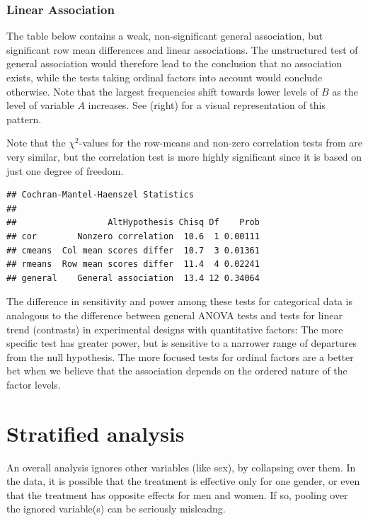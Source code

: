 \documentclass[11pt]{book}
\renewenvironment{knitrout}{\small\renewcommand{\baselinestretch}{.85}}{} %
\begin{document}
\subsubsection{Linear Association}

The table below contains a weak,
non-significant general association, but significant row mean
differences and linear associations.
The unstructured test of general association would therefore
lead to the conclusion that no association exists, while the
tests taking ordinal factors into account would conclude otherwise.
Note that the largest frequencies
shift towards lower levels of $B$ as the level of variable $A$ increases.
See (right) for a visual representation of this pattern.



Note that the \(\chi^2\)-values for the row-means and non-zero
correlation tests from 
are very similar, but the correlation test is more
highly significant since it is based on just one degree of
freedom.
\begin{knitrout}
\color{fgcolor}\begin{kframe}
\begin{alltt}
\end{alltt}
\begin{verbatim}
## Cochran-Mantel-Haenszel Statistics 
## 
##                  AltHypothesis Chisq Df    Prob
## cor        Nonzero correlation  10.6  1 0.00111
## cmeans  Col mean scores differ  10.7  3 0.01361
## rmeans  Row mean scores differ  11.4  4 0.02241
## general    General association  13.4 12 0.34064
\end{verbatim}
\end{kframe}
\end{knitrout}
The difference in sensitivity and power among these tests 
for categorical data is
analogous to the difference between general ANOVA tests and tests for
linear trend (contrasts)
in experimental designs with quantitative factors:
The more specific test has greater power, but is sensitive to
a narrower range of departures from the null hypothesis.
The more focused tests for ordinal factors are a better bet
when we believe that the association depends on the ordered
nature of the factor levels.

\section{Stratified analysis}\label{sec:twoway-strat}
An overall analysis ignores other variables (like sex), by
collapsing over them.  In the  data,
it is possible that the treatment is effective
only for one gender, or even that the treatment has opposite effects
for men and women.  If so, pooling over the ignored variable(s)
can be seriously misleadng.
\end{document}
